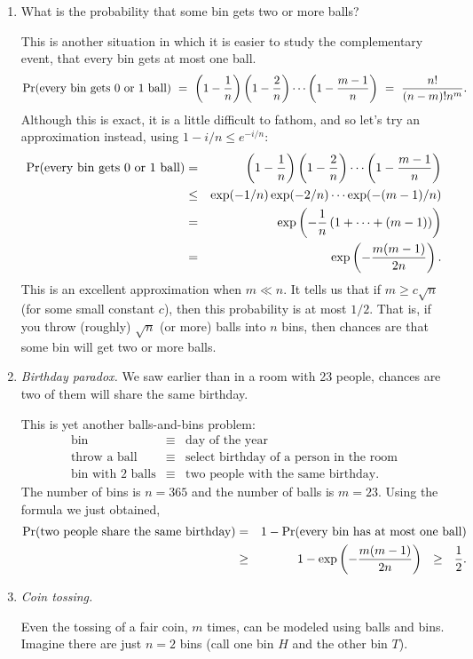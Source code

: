 \documentclass{report}
\theoremstyle{plain}
\theoremstyle{definition}
\newcommand{\pr}{\mbox{\rm Pr}}
\begin{document}
\begin{enumerate}
\item What is the probability that some bin gets two or more balls?

This is another situation in which it is easier to study the complementary event, that every bin gets at most one ball.
$$
\pr(\mbox{every bin gets $0$ or $1$ ball})
\ = \ 
\left(1 - \frac{1}{n}\right) \left( 1- \frac{2}{n} \right)\cdots \left( 1- \frac{m-1}{n} \right)
\ = \ 
\frac{n!}{(n-m)! n^m}.
$$
Although this is exact, it is a little difficult to fathom, and so let's try an approximation instead, using $1-i/n \leq e^{-i/n}$:
\begin{eqnarray*}
\pr(\mbox{every bin gets $0$ or $1$ ball})
& = & 
\left(1 - \frac{1}{n}\right) \left( 1 - \frac{2}{n} \right) \cdots \left( 1- \frac{m-1}{n} \right) \\
& \leq & \exp(-1/n) \exp(-2/n) \cdots \exp(-(m-1)/n)  \\
& = & 
\exp\left(-\frac{1}{n} \left(1 + \cdots + (m-1) \right) \right) \\
& = &  
\exp\left(-\frac{m(m-1)}{2n} \right).
\end{eqnarray*}
This is an excellent approximation when $m \ll n$. It tells us that if $m \geq c \sqrt{n}$ (for some small constant $c$), then this probability is at most $1/2$. That is, if you throw (roughly) $\sqrt{n}$ (or more) balls into $n$ bins, then chances are that some bin will get two or more balls.

\item {\it Birthday paradox.} We saw earlier than in a room with 23 people, chances are two of them will share the same birthday.

This is yet another balls-and-bins problem:
\begin{eqnarray*}
\mbox{bin} & \equiv & \mbox{day of the year} \\
\mbox{throw a ball} & \equiv & \mbox{select birthday of a person in the room} \\
\mbox{bin with $2$ balls} & \equiv & \mbox{two people with the same birthday} .
\end{eqnarray*}
The number of bins is $n = 365$ and the number of balls is $m=23$. Using the formula we just obtained,
\begin{eqnarray*}
\pr(\mbox{two people share the same birthday})
& = & 
1 - \pr(\mbox{every bin has at most one ball}) \\
& \geq & 
1 - \exp \left(-\frac{m(m-1)}{2n} \right)
\ \ \geq \ \ 
\frac{1}{2} .
\end{eqnarray*}

\item {\it Coin tossing.}

Even the tossing of a fair coin, $m$ times, can be modeled using balls and bins. Imagine there are just $n=2$ bins (call one bin $H$ and the other bin $T$).
\end{enumerate}
\end{document}
